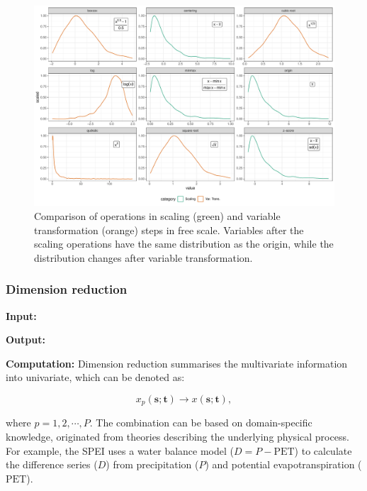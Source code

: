 \documentclass[
]{interact}
\begin{document}
\begin{figure}

{\centering \includegraphics{tidyindex_files/figure-pdf/fig-scale-var-trans-compare-1.pdf}

}

\caption{\label{fig-scale-var-trans-compare}Comparison of operations in
scaling (green) and variable transformation (orange) steps in free
scale. Variables after the scaling operations have the same distribution
as the origin, while the distribution changes after variable
transformation.}

\end{figure}

\hypertarget{dimension-reduction}{%
\subsubsection{Dimension reduction}\label{dimension-reduction}}

\textbf{Input: }

\textbf{Output: }

\textbf{Computation:} Dimension reduction summarises the multivariate
information into univariate, which can be denoted as:

\begin{equation}
x_p(\mathbf{s}; \mathbf{t}) \rightarrow x(\mathbf{s}; \mathbf{t}),
\end{equation}

where \(p = 1, 2, \cdots, P\). The combination can be based on
domain-specific knowledge, originated from theories describing the
underlying physical process. For example, the SPEI uses a water balance
model (\(D = P - \text{PET}\)) to calculate the difference series
(\(D\)) from precipitation (\(P\)) and potential evapotranspiration
(\(\text{PET}\)).
\end{document}
